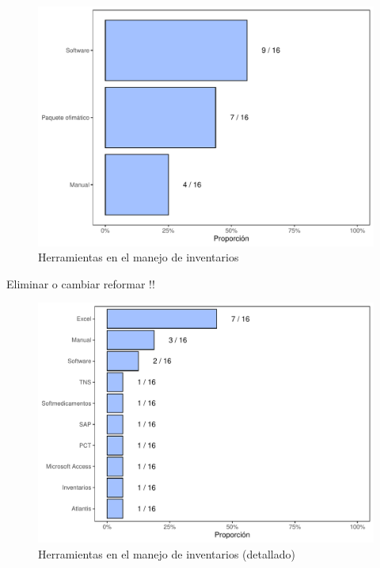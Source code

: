 \documentclass[
]{book}
\begin{document}
\begin{figure}
\includegraphics[width=0.85\linewidth]{InformeFinal_files/figure-latex/HerramientasManejoInventarios-1} \caption{Herramientas en el manejo de inventarios}\label{fig:HerramientasManejoInventarios}
\end{figure}

Eliminar o cambiar reformar !!

\begin{figure}
\includegraphics[width=0.85\linewidth]{InformeFinal_files/figure-latex/HerramientasManejoInventarios1-1} \caption{Herramientas en el manejo de inventarios (detallado)}\label{fig:HerramientasManejoInventarios1}
\end{figure}
\end{document}
